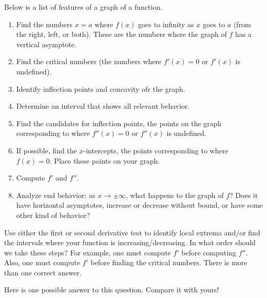 \documentclass{ximera}
\begin{document}
\begin{problem}%
  Below is a list of features of a graph of a function.
  \begin{enumerate}
  \item Find the numbers $x=a$ where
    $f(x)$ goes to infinity as $x$ goes to $a$ (from the right, left,
    or both). These are the numbers where the graph of $f$ has a  vertical asymptote.
  \item Find the critical numbers (the numbers where $f'(x) = 0$ or
    $f'(x)$ is undefined).
 
  \item Identify inflection points and concavity ofr the graph.
  \item Determine an interval that shows all relevant behavior.
  \item Find the candidates for inflection points, the points on the graph corresponding to where
    $f''(x) = 0$ or $f''(x)$ is undefined.
  \item If possible, find the $x$-intercepts, the points corresponding to where $f(x) =
    0$. Place these points on your graph.
       \item Compute $f'$ and $f''$.
  \item Analyze end behavior:  as $x \to \pm \infty$, what happens to the graph of $f$?  Does it  have horizontal asymptotes, increase or decrease without bound, or have some other kind of behavior?
 \end{enumerate}
   \item Use either the first or second derivative test to identify local extrema and/or
    find the intervals where your function is increasing/decreasing.
  In what order should we take these steps? For example, one must compute
   $f'$ before computing $f''$. Also, one must compute $f'$ before 
   finding the critical numbers. There is more than one correct answer.
  \begin{freeResponse}
  Here is one possible answer to this question.  Compare it with yours!
\end{freeResponse}
\end{problem}
\end{document}
